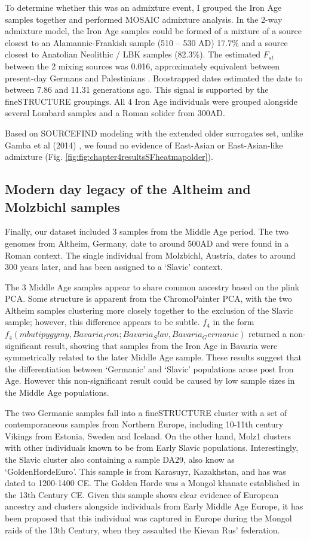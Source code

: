 To determine whether this was an admixture event, I grouped the Iron Age samples together and performed MOSAIC admixture analysis. In the 2-way admixture model, the Iron Age samples could be formed of a mixture of a source closest to an Alamannic-Frankish sample (510 – 530 AD) 17.7\% and a source closest to Anatolian Neolithic / LBK samples (82.3\%). The estimated $F_{st}$ between the 2 mixing sources was 0.016, approximately equivalent between present-day Germans and Palestinians \cite{nelis2009genetic}.  Boostrapped dates estimated the date to between 7.86 and 11.31 generations ago.  This signal is supported by the fineSTRUCTURE groupings. All 4 Iron Age individuals were grouped alongside several Lombard samples and a Roman solider from 300AD. 

Based on SOURCEFIND modeling with the extended older surrogates set, unlike Gamba et al (2014) \cite{Gamba2014}, we found no evidence of East-Asian or East-Asian-like admixture (Fig. \ref{fig:fig:chapter4resultsSFheatmapolder}).


\subsection{Modern day legacy of the Altheim and Molzbichl samples}

Finally, our dataset included 3 samples from the Middle Age period. The two genomes from Altheim, Germany, date to around 500AD and were found in a Roman context. The single individual from Molzbichl, Austria, dates to around 300 years later, and has been assigned to a `Slavic' context.  

The 3 Middle Age samples appear to share common ancestry based on the plink PCA. Some structure is apparent from the ChromoPainter PCA, with the two Altheim samples clustering more closely together to the exclusion of the Slavic sample; however, this difference appears to be subtle. $f_{4}$ in the form $f_{4}(mbutipygymy, Bavaria_Iron; Bavaria_Slav, Bavaria_Germanic)$ returned a non-significant result, showing that samples from the Iron Age in Bavaria were symmetrically related to the later Middle Age sample. These results suggest that the differentiation between `Germanic' and `Slavic' populations arose post Iron Age. However this non-significant result could be caused by low sample sizes in the Middle Age populations. 

The two Germanic samples fall into a fineSTRUCTURE cluster with a set of contemporaneous samples from Northern Europe, including 10-11th century Vikings from Estonia, Sweden and Iceland. On the other hand, Molz1 clusters with other individuals known to be from Early Slavic populations. Interestingly, the Slavic cluster also containing a sample DA29, also know as `GoldenHordeEuro'. This sample is from Karasuyr, Kazakhstan, and has was dated to 1200-1400 CE. The Golden Horde was a Mongol khanate established in the 13th Century CE. Given this sample shows clear evidence of European ancestry and clusters alongside individuals from Early Middle Age Europe, it has been proposed that this individual was captured in Europe during the Mongol raids of the 13th Century, when they assaulted the Kievan Rus' federation.

